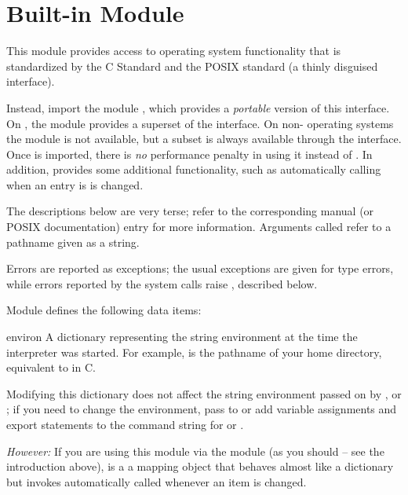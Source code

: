 \section{Built-in Module }
\label{module-posix}

This module provides access to operating system functionality that is
standardized by the C Standard and the POSIX standard (a thinly disguised
\UNIX{} interface).

  Instead, import the
module , which provides a \emph{portable} version of this
interface.  On \UNIX{}, the  module provides a superset of
the  interface.  On non-\UNIX{} operating systems the
 module is not available, but a subset is always available
through the  interface.  Once  is imported, there is
\emph{no} performance penalty in using it instead of
.  In addition,  provides some additional
functionality, such as automatically calling 
when an entry is  is changed.

The descriptions below are very terse; refer to the corresponding
\UNIX{} manual (or POSIX documentation) entry for more information.
Arguments called  refer to a pathname given as a string.

Errors are reported as exceptions; the usual exceptions are given
for type errors, while errors reported by the system calls raise
, described below.

Module  defines the following data items:

\renewcommand{\indexsubitem}{(data in module posix)}
\begin{datadesc}{environ}
A dictionary representing the string environment at the time
the interpreter was started.
For example,
is the pathname of your home directory, equivalent to
in C.

Modifying this dictionary does not affect the string environment
passed on by ,  or ; if you
need to change the environment, pass  to 
or add variable assignments and export statements to the command
string for  or .

\emph{However:} If you are using this module via the  module
(as you should -- see the introduction above),  is a
a mapping object that behaves almost like a dictionary but invokes
 automatically called whenever an item is changed.
\end{datadesc}

